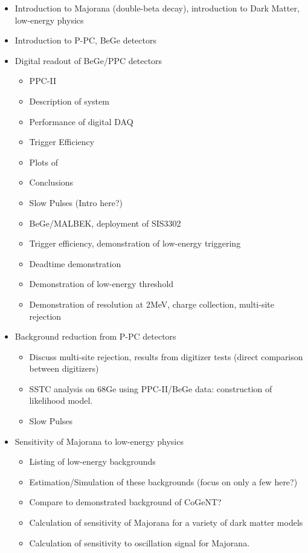 \documentclass{article}
\begin{document}
  \begin{itemize}
    \item Introduction to Majorana (double-beta decay), introduction to Dark Matter, low-energy physics
    \item Introduction to P-PC, BeGe detectors
    \item Digital readout of BeGe/PPC detectors 
    \begin{itemize}
      \item PPC-II
          \item Description of system
          \item Performance of digital DAQ
              \item Trigger Efficiency
              \item Plots of 
          \item Conclusions  
          \item Slow Pulses (Intro here?)
      \item BeGe/MALBEK, deployment of SIS3302
          \item Trigger efficiency, demonstration of low-energy triggering
          \item Deadtime demonstration 
      \item Demonstration of low-energy threshold
      \item Demonstration of resolution at 2MeV, charge collection, multi-site rejection 
    \end{itemize}

    \item Background reduction from P-PC detectors 
    \begin{itemize}
      \item Discuss multi-site rejection, 
                results from digitizer tests (direct comparison between digitizers)
      \item SSTC analysis on 68Ge using PPC-II/BeGe data: construction of likelihood model.
      \item Slow Pulses
    \end{itemize}
    \item Sensitivity of Majorana to low-energy physics 
    \begin{itemize}
      \item Listing of low-energy backgrounds
      \item Estimation/Simulation of these backgrounds (focus on only a few here?)
      \item Compare to demonstrated background of CoGeNT? 
      \item Calculation of sensitivity of Majorana for a variety of dark matter models 
      \item Calculation of sensitivity to oscillation signal for Majorana. 
    \end{itemize}


\end{itemize}
\end{document}
